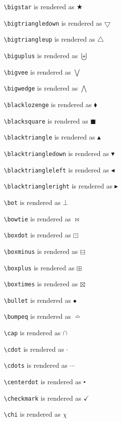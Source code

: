 \texttt{\textbackslash bigstar} is rendered as $\bigstar$

\texttt{\textbackslash bigtriangledown} is rendered as $\bigtriangledown$

\texttt{\textbackslash bigtriangleup} is rendered as $\bigtriangleup$

\texttt{\textbackslash biguplus} is rendered as $\biguplus$

\texttt{\textbackslash bigvee} is rendered as $\bigvee$

\texttt{\textbackslash bigwedge} is rendered as $\bigwedge$

\texttt{\textbackslash blacklozenge} is rendered as $\blacklozenge$

\texttt{\textbackslash blacksquare} is rendered as $\blacksquare$

\texttt{\textbackslash blacktriangle} is rendered as $\blacktriangle$

\texttt{\textbackslash blacktriangledown} is rendered as $\blacktriangledown$

\texttt{\textbackslash blacktriangleleft} is rendered as $\blacktriangleleft$

\texttt{\textbackslash blacktriangleright} is rendered as $\blacktriangleright$

\texttt{\textbackslash bot} is rendered as $\bot$

\texttt{\textbackslash bowtie} is rendered as $\bowtie$

\texttt{\textbackslash boxdot} is rendered as $\boxdot$

\texttt{\textbackslash boxminus} is rendered as $\boxminus$

\texttt{\textbackslash boxplus} is rendered as $\boxplus$

\texttt{\textbackslash boxtimes} is rendered as $\boxtimes$

\texttt{\textbackslash bullet} is rendered as $\bullet$

\texttt{\textbackslash bumpeq} is rendered as $\bumpeq$

\texttt{\textbackslash cap} is rendered as $\cap$

\texttt{\textbackslash cdot} is rendered as $\cdot$

\texttt{\textbackslash cdots} is rendered as $\cdots$

\texttt{\textbackslash centerdot} is rendered as $\centerdot$

\texttt{\textbackslash checkmark} is rendered as $\checkmark$

\texttt{\textbackslash chi} is rendered as $\chi$

